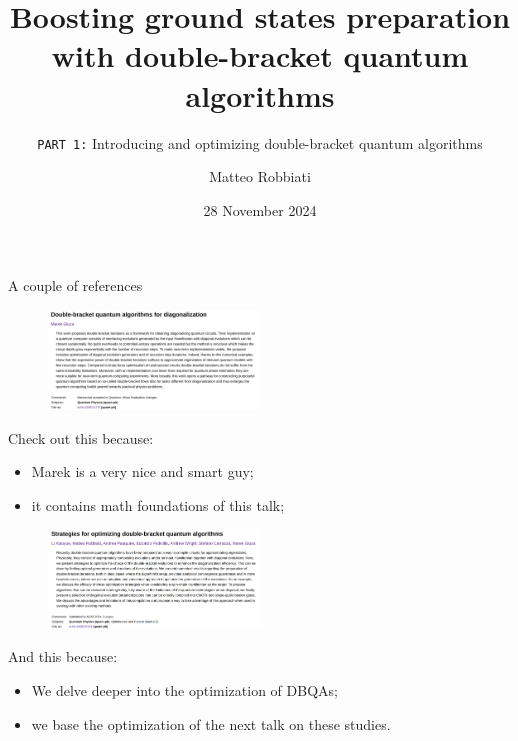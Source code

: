 \documentclass[aspectratio=169, 8pt, xcolor={svgnames}]{beamer}
\title{Boosting ground states preparation with double-bracket quantum algorithms}
\subtitle{\texttt{PART 1:} Introducing and optimizing double-bracket quantum algorithms}
\date{28 November 2024}
\author{Matteo Robbiati}
\begin{document}
\begin{frame}
\maketitle
\end{frame}

\begin{frame}{A couple of references}
\begin{multicols}{2}
\begin{figure}
   \includegraphics[width=0.5\textwidth]{figures/dbqa_paper.png}
\end{figure}
Check out this because:
\begin{itemize}[noitemsep]
\item[1.] Marek is a very nice and smart guy;
\item[2.] it contains math foundations of this talk; 
\end{itemize}
\begin{figure}
   \includegraphics[width=0.5\textwidth]{figures/dbqa_opt.png}
\end{figure}
And this because:
\begin{itemize}[noitemsep]
\item[1.] We delve deeper into the optimization of DBQAs;
\item[2.] we base the optimization of the next talk on these studies. 
\end{itemize}
\end{multicols}
\end{frame}
\end{document}
